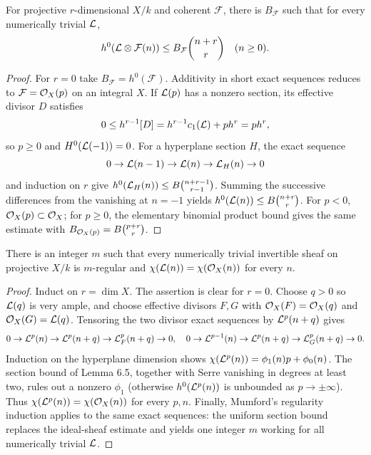 \begin{lemma}\label{kps-lem-section-bound}
For projective $r$-dimensional $X/k$ and coherent $\mathcal F$, there is
$B_{\mathcal F}$ such that for every numerically trivial $\mathcal L$,
\[h^0(\mathcal L\otimes\mathcal F(n))\le B_{\mathcal F}\binom{n+r}{r}\quad(n\ge0).\]
\end{lemma}
\begin{proof}
For $r=0$ take $B_{\mathcal F}=h^0(\mathcal F)$. Additivity in short exact
sequences reduces to $\mathcal F=\mathcal O_X(p)$ on an integral $X$. If
$\mathcal L(p)$ has a nonzero section, its effective divisor $D$ satisfies
\[
  0\le h^{r-1}[D]=h^{r-1}c_1(\mathcal L)+p h^r=p h^r,
\]
so $p\ge0$ and $H^0(\mathcal L(-1))=0$. For a hyperplane section $H$, the exact
sequence
\[
0\to\mathcal L(n-1)\to\mathcal L(n)\to\mathcal L_H(n)\to0
\]
and induction on $r$ give
$h^0(\mathcal L_H(n))\le B\binom{n+r-1}{r-1}$. Summing the successive
differences from the vanishing at $n=-1$ yields
$h^0(\mathcal L(n))\le B\binom{n+r}{r}$. For $p<0$, $\mathcal O_X(p)\subset\mathcal O_X$;
for $p\ge0$, the elementary binomial product bound gives the same estimate
with $B_{\mathcal O_X(p)}=B\binom{p+r}{r}$.
\end{proof}

\begin{lemma}\label{kps-lem-uniform-regularity}
There is an integer $m$ such that every numerically trivial invertible sheaf on
projective $X/k$ is $m$-regular and
$\chi(\mathcal L(n))=\chi(\mathcal O_X(n))$ for every $n$.
\end{lemma}
\begin{proof}
Induct on $r=\dim X$. The assertion is clear for $r=0$. Choose $q>0$ so
$\mathcal L(q)$ is very ample, and choose effective divisors $F,G$ with
$\mathcal O_X(F)=\mathcal O_X(q)$ and $\mathcal O_X(G)=\mathcal L(q)$. Tensoring the two divisor exact
sequences by $\mathcal L^p(n+q)$ gives
\[
0\to\mathcal L^p(n)\to\mathcal L^p(n+q)\to\mathcal L_F^p(n+q)\to0,
\quad
0\to\mathcal L^{p-1}(n)\to\mathcal L^p(n+q)\to\mathcal L_G^p(n+q)\to0.
\]
Induction on the hyperplane dimension shows
$\chi(\mathcal L^p(n))=\phi_1(n)p+\phi_0(n)$. The section bound of Lemma 6.5,
together with Serre vanishing in degrees at least two, rules out a nonzero
$\phi_1$ (otherwise $h^0(\mathcal L^p(n))$ is unbounded as $p\to\pm\infty$).
Thus $\chi(\mathcal L^p(n))=\chi(\mathcal O_X(n))$ for every $p,n$. Finally, Mumford's
regularity induction applies to the same exact sequences: the uniform section
bound replaces the ideal-sheaf estimate and yields one integer $m$ working for
all numerically trivial $\mathcal L$.
\end{proof}

